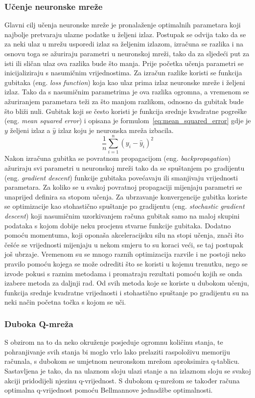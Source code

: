 \subsubsection{Učenje neuronske mreže}
Glavni cilj učenja neuronske mreže je pronalaženje optimalnih parametara koji najbolje pretvaraju ulazne podatke u željeni izlaz. Postupak se odvija tako da se za neki ulaz u mrežu usporedi izlaz sa željenim izlazom, izračuna se razlika i na osnovu toga se ažuriraju parametri u neuronskoj mreži, tako da za sljedeći put za isti ili sličan ulaz ova razlika bude što manja. Prije početka učenja parametri se inicijaliziraju s nasumičnim vrijednostima. Za izračun razlike koristi se funkcija gubitaka (eng. \textit{loss function}) koja kao ulaz prima izlaz neuronske mreže i željeni izlaz. Tako da s nasumičnim parametrima je ova razlika ogromna, a vremenom se ažuriranjem parametara teži za što manjom razlikom, odnosno da gubitak bude što bliži nuli. Gubitak koji se često koristi je funkcija srednje kvadratne pogreške (eng. \textit{mean squared error}) i opisana je formulom~\ref{eq:mean_squared_error} gdje je $y$ željeni izlaz a $\hat{y}$ izlaz koju je neuronska mreža izbacila. 
\begin{equation}\label{eq:mean_squared_error}
\frac{1}{n}\sum_{i=1}^{n}(y_i - \hat{y}_i)^2
\end{equation}
Nakon izračuna gubitka se povratnom propagacijom (eng. \textit{backpropagation}) ažuriraju svi parametri u neuronskoj mreži tako da se spuštanjem po gradijentu (eng. \textit{gradient descent}) funkcije gubitaka povećavaju ili smanjivaju vrijednosti parametara. Za koliko se u svakoj povratnoj propagaciji mijenjaju parametri se unaprijed definira sa stopom učenja. Za ubrzavanje konvergencije gubitka koriste se optimizacije kao stohastično spuštanje po gradijentu (eng. \textit{stochastic gradient descent}) koji nasumičnim uzorkivanjem računa gubitak samo na maloj skupini podataka s kojom dobije neku procjenu stvarne funkcije gubitaka. Dodatno pomoću momentuma, koji oponaša akceleracijsku silu na stopi učenja, znači što češće se vrijednosti mijenjaju u nekom smjeru to su koraci veći, se taj postupak još ubrzaje. Vremenom su se mnogo raznih optimizacija razvile i ne postoji neko pravilo pomoću kojega se može odrediti što se koristi u kojemu trenutku, nego se izvode pokusi s raznim metodama i promatraju rezultati pomoću kojih se onda izabere metoda za daljnji rad. Od svih metoda koje se koriste u dubokom učenju, funkcija srednje kvadratne vrijednosti i stohastično spuštanje po gradijentu su na neki način početna točka s kojom se uči.

\subsubsection{Duboka Q-mreža}
S obzirom na to da neko okruženje posjeduje ogromnu količinu stanja, te pohranjivanje svih stanja bi moglo vrlo lako prelaziti raspoloživu memoriju računala, s dubokom se umjetnom neuronskom mrežom aproksimira q-tablicu. Sastavljena je tako, da na ulaznom sloju ulazi stanje a na izlaznom sloju se svakoj akciji pridodijeli njezinu q-vrijednost. S dubokom q-mrežom se također računa optimalna q-vrijednost pomoću Bellmannove jednadžbe optimalnosti.
